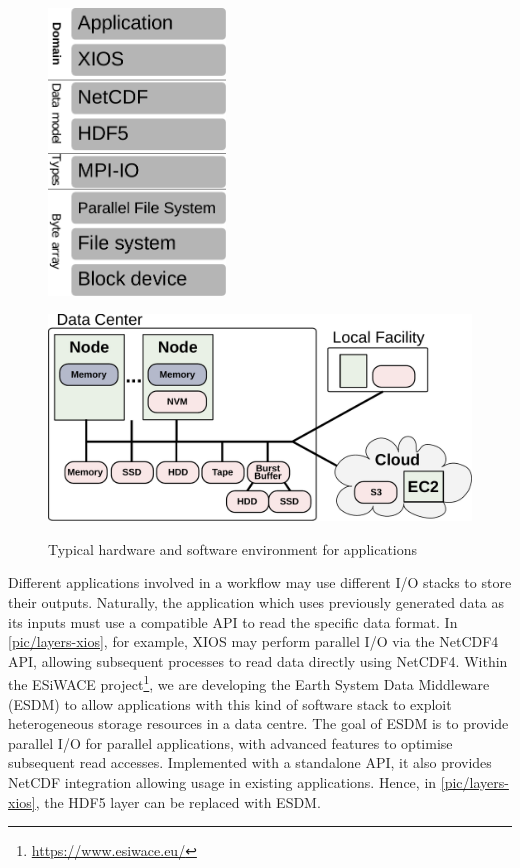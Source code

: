 \documentclass{superfri}
\begin{document}
\begin{figure}[b]
    \begin{minipage}{.42\linewidth}
        \centering
        \includegraphics[width=0.42\textwidth]{pic/layers-xios}
        \label{pic/layers-xios}
    \end{minipage}
    \begin{minipage}{.58\linewidth}
        \centering
        \includegraphics[width=1\textwidth]{pic/system}
        \label{pic/system}
    \end{minipage}
    \vspace{5pt}
    \caption{Typical hardware and software environment for applications}
    \label{fig:34}
\end{figure}

Different applications involved in a workflow may use different I/O stacks to store their outputs.
Naturally, the application which uses previously generated data as its inputs must use a compatible API to read the specific data format.
In \cref{pic/layers-xios}, for example, XIOS may perform parallel I/O via the NetCDF4 API, allowing subsequent processes to read data directly using NetCDF4.
Within the ESiWACE project\footnote{\url{https://www.esiwace.eu/}}, we are developing the Earth System Data Middleware (ESDM)\cite{esdm} to allow applications with this kind of software stack to exploit heterogeneous storage resources in a data centre.
The goal of ESDM is to provide parallel I/O for parallel applications, with advanced features to optimise subsequent read accesses.
Implemented with a standalone API, it also provides NetCDF integration allowing usage in existing applications.
Hence, in \cref{pic/layers-xios}, the HDF5 layer can be replaced with ESDM.
\end{document}
